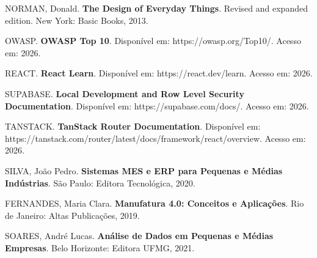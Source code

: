 \documentclass[12pt,a4paper]{article}
\begin{document}
\bigskip

NORMAN, Donald. 
{\bfseries The Design of Everyday Things}. 
Revised and expanded edition. New York: Basic Books, 2013. 

\bigskip

OWASP. 
{\bfseries OWASP Top 10}. 
Disponível em: https://owasp.org/Top10/. Acesso em: 2026. 

\bigskip

REACT. 
{\bfseries React Learn}. 
Disponível em: https://react.dev/learn. Acesso em: 2026. 

\bigskip

SUPABASE. 
{\bfseries Local Development and Row Level Security Documentation}. 
Disponível em: https://supabase.com/docs/. Acesso em: 2026. 

\bigskip

TANSTACK. 
{\bfseries TanStack Router Documentation}. 
Disponível em: https://tanstack.com/router/latest/docs/framework/react/overview. Acesso em: 2026. 

SILVA, João Pedro. 
{\bfseries Sistemas MES e ERP para Pequenas e Médias Indústrias}. 
São Paulo: Editora Tecnológica, 2020. 

FERNANDES, Maria Clara. 
{\bfseries Manufatura 4.0: Conceitos e Aplicações}. 
Rio de Janeiro: Altas Publicações, 2019. 

SOARES, André Lucas. 
{\bfseries Análise de Dados em Pequenas e Médias Empresas}. 
Belo Horizonte: Editora UFMG, 2021. 
\end{document}
